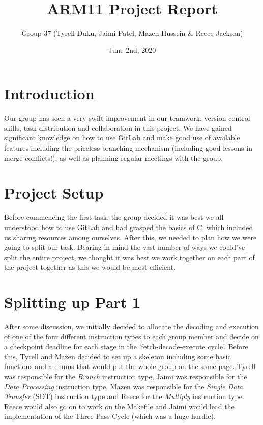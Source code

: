\documentclass[10pt]{article}
\title{ARM11 Project Report}
\author{Group 37 (Tyrell Duku, Jaimi Patel, Mazen Hussein & Reece Jackson) }
\date{June 2nd, 2020}
\begin{document}
\maketitle
\section{Introduction}
Our group has seen a very swift improvement in our teamwork, version control skills, task distribution and collaboration in this project. We have gained significant knowledge on how to use GitLab and make good use of available features including the priceless branching mechanism (including good lessons in merge conflicts!), as well as planning regular meetings with the group.

\section{Project Setup}
Before commencing the first task, the group decided it was best we all understood how to use GitLab and had grasped the basics of C, which included us sharing resources among ourselves. After this, we needed to plan how we were going to split our task. Bearing in mind the vast number of ways we could've split the entire project, we thought it was best we work together on each part of the project together as this we would be most efficient.

\section{Splitting up Part 1}
After some discussion, we initially decided to allocate the decoding and execution of one of the four different instruction types to each group member and decide on a checkpoint deadline for each stage in the 'fetch-decode-execute cycle'. Before this, Tyrell and Mazen decided to set up a skeleton including some basic functions and a enums that would put the whole group on the same page. Tyrell was responsible for the \textit{Branch} instruction type, Jaimi was responsible for the \textit{Data Processing} instruction type, Mazen was responsible for the \textit{Single Data Transfer} (SDT) instruction type and Reece for the \textit{Multiply} instruction type. Reece would also go on to work on the Makefile and Jaimi would lead the implementation of the Three-Pass-Cycle (which was a huge hurdle).
\end{document}
